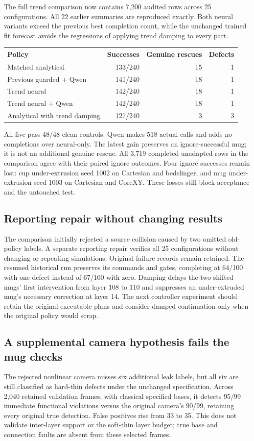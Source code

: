 \documentclass[10pt,letterpaper]{article}
\begin{document}
The full trend comparison now contains 7,200 audited rows across 25
configurations. All 22 earlier summaries are reproduced exactly. Both neural
variants exceed the previous best completion count, while the unchanged trained
fit forecast avoids the regressions of applying trend damping to every part.

\begin{center}
\begin{tabular}{@{}lrrr@{}}
\toprule
Policy & Successes & Genuine rescues & Defects \\
\midrule
Matched analytical & 133/240 & 15 & 1 \\
Previous guarded + Qwen & 141/240 & 18 & 1 \\
Trend neural & 142/240 & 18 & 1 \\
Trend neural + Qwen & 142/240 & 18 & 1 \\
Analytical with trend damping & 127/240 & 3 & 3 \\
\bottomrule
\end{tabular}
\end{center}
All five pass 48/48 clean controls. Qwen makes 518 actual calls and adds no
completions over neural-only. The latest gain preserves an ignore-successful mug;
it is not an additional genuine rescue. All 3,719 completed unadapted rows in
the comparison agree with their paired ignore outcomes. Four ignore successes
remain lost: cup under-extrusion seed 1002 on Cartesian and bedslinger, and mug
under-extrusion seed 1003 on Cartesian and CoreXY. These losses still block
acceptance and the untouched test.

\subsection*{Reporting repair without changing results}
The comparison initially rejected a source collision caused by two omitted old-policy
labels. A separate reporting repair verifies all 25 configurations without changing
or repeating simulations. Original failure records remain retained. The resumed
historical run preserves its commands and gates, completing at 64/100 with one defect instead
of 67/100 with zero. Damping delays the two shifted mugs' first intervention
from layer 108 to 110 and suppresses an under-extruded mug's necessary correction
at layer 14. The next controller experiment should retain the original executable
plans and consider damped continuation only when the original policy would scrap.

\subsection*{A supplemental camera hypothesis fails the mug checks}
The rejected nonlinear camera misses six additional leak labels, but all six
are still classified as hard-thin defects under the unchanged specification.
Across 2,040 retained validation frames, with classical specified bases, it
detects 95/99 immediate functional violations versus the original camera's
90/99, retaining every original true detection. False positives rise from 33
to 35. This does not validate inter-layer support or the soft-thin layer budget;
true base and connection faults are absent from these selected frames.
\end{document}
